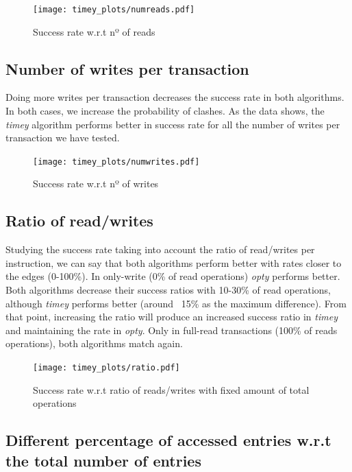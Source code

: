 \documentclass[a4paper, 10pt]{article}
\begin{document}
\begin{figure}[H]
  \centering
  \texttt{[image: timey\_plots/numreads.pdf]}
    \caption{Success rate w.r.t nº of reads}
    \label{timey:numreads}
\end{figure} 

\clearpage
\subsection{Number of writes per transaction}

Doing more writes per transaction decreases the success rate in both algorithms. In both cases, we increase the probability of clashes. As the data shows, the \textit{timey} algorithm performs better in success rate for all the number of writes per transaction we have tested.

\begin{figure}[H]
  \centering
  \texttt{[image: timey\_plots/numwrites.pdf]}
    \caption{Success rate w.r.t nº of writes}
    \label{timey:numwrites}
\end{figure} 

\clearpage
\subsection{Ratio of read/writes}

Studying the success rate taking into account the ratio of read/writes per instruction, we can say that both algorithms perform better with rates closer to the edges (0-100\%). In only-write (0\% of read operations) \textit{opty} performs better. Both algorithms decrease their success ratios with 10-30\% of read operations, although \textit{timey} performs better (around ~15\% as the maximum difference). From that point, increasing the ratio will produce an increased success ratio in \textit{timey} and maintaining the rate in \textit{opty}. Only in full-read transactions (100\% of reads operations), both algorithms match again.

\begin{figure}[H]
  \centering
  \texttt{[image: timey\_plots/ratio.pdf]}
    \caption{Success rate w.r.t ratio of reads/writes with fixed amount of total operations}
    \label{timey:ratio}
\end{figure} 

\clearpage
\subsection{Different percentage of accessed entries w.r.t the total number of entries}
\end{document}
